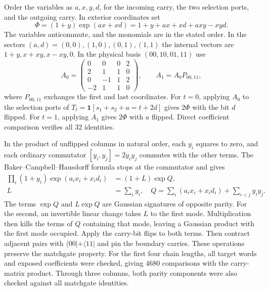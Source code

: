 \documentclass[11pt,a4paper]{article}
\numberwithin{equation}{section}
\begin{document}
Order the variables as \(a,x,y,d\), for the incoming carry, the two selection ports, and the outgoing carry. In exterior coordinates set
\begin{equation}\label{eq:local-signature}
\Phi=(1+y)\exp(ax+xd)=1+y+ax+xd+axy-xyd.
\end{equation}
The variables anticommute, and the monomials are in the stated order. In the sectors \((a,d)=(0,0),(1,0),(0,1),(1,1)\) the internal vectors are \(1+y,x+xy,x-xy,0\). In the physical basis \((00,10,01,11)\) use
\begin{equation}\label{eq:port-bases}
A_0=\begin{pmatrix}
0&0&0&2\\
2&1&1&0\\
0&-1&1&2\\
-2&1&1&0
\end{pmatrix},
\qquad A_1=A_0 P_{00,11},
\end{equation}
where \(P_{00,11}\) exchanges the first and last coordinates. For \(t=0\), applying \(A_0\) to the selection ports of \(T_t=\mathbf1[s_1+s_2+a=t+2d]\) gives \(2\Phi\) with the bit \(d\) flipped. For \(t=1\), applying \(A_1\) gives \(2\Phi\) with \(a\) flipped. Direct coefficient comparison verifies all \(32\) identities.

In the product of unflipped columns in natural order, each \(y_i\) squares to zero, and each ordinary commutator \([y_i,y_j]=2y_i y_j\) commutes with the other terms. The Baker--Campbell--Hausdorff formula stops at the commutator and gives
\begin{equation}\label{eq:chain-product}
\begin{aligned}
\prod_i(1+y_i)\exp(a_i x_i+x_i d_i)&=(1+L)\exp Q,\\
L&=\sum_i y_i,\quad Q=\sum_i(a_i x_i+x_i d_i)+\sum_{i<j}y_i y_j .
\end{aligned}
\end{equation}
The terms \(\exp Q\) and \(L\exp Q\) are Gaussian signatures of opposite parity. For the second, an invertible linear change takes \(L\) to the first mode. Multiplication then kills the terms of \(Q\) containing that mode, leaving a Gaussian product with the first mode occupied. Apply the carry-bit flips to both terms. Then contract adjacent pairs with \(\langle00|+\langle11|\) and pin the boundary carries. These operations preserve the matchgate property. For the first four chain lengths, all target words and exposed coefficients were checked, giving \(4680\) comparisons with the carry-matrix product. Through three columns, both parity components were also checked against all matchgate identities.
\end{document}

